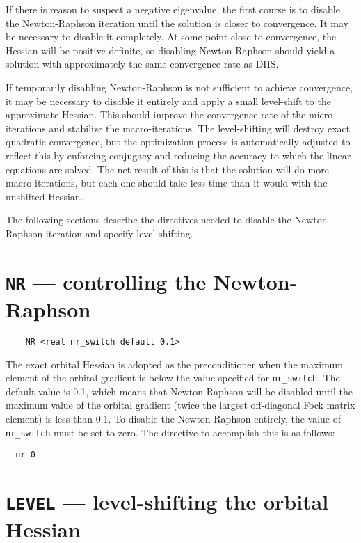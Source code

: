 If there is reason to suspect a negative eigenvalue, the first course
is to disable the Newton-Raphson iteration until the solution is
closer to convergence.  It may be necessary to disable it completely.
At some point close to convergence, the Hessian will be positive
definite, so disabling Newton-Raphson should yield a solution with
approximately the same convergence rate as DIIS.

If temporarily disabling Newton-Raphson is not sufficient to achieve
convergence, it may be necessary to disable it entirely and apply a
small level-shift to the approximate Hessian.  This should improve the
convergence rate of the micro-iterations and stabilize the
macro-iterations.  The level-shifting will destroy exact quadratic
convergence, but the optimization process is automatically adjusted to
reflect this by enforcing conjugacy and reducing the accuracy to which
the linear equations are solved.  The net result of this is that the
solution will do more macro-iterations, but each one should take less
time than it would with the unshifted Hessian.

The following sections describe the directives needed to disable the
Newton-Raphson iteration and specify level-shifting.

\section{{\tt NR} --- controlling the Newton-Raphson}
\label{sec:nrswitch}

\begin{verbatim}
    NR <real nr_switch default 0.1>
\end{verbatim}

The exact orbital Hessian is adopted as the preconditioner when the
maximum element of the orbital gradient is below the value specified
for \verb+nr_switch+.  The default value is 0.1, which means that
Newton-Raphson will be disabled until the maximum value of the orbital
gradient (twice the largest off-diagonal Fock matrix element) is less
than 0.1.   To disable the Newton-Raphson entirely, the
value of \verb+nr_switch+ must be set to zero.  The directive to accomplish
this is as follows:
\begin{verbatim}
  nr 0
\end{verbatim}

\section{{\tt LEVEL} --- level-shifting the orbital Hessian}
\label{sec:level}

